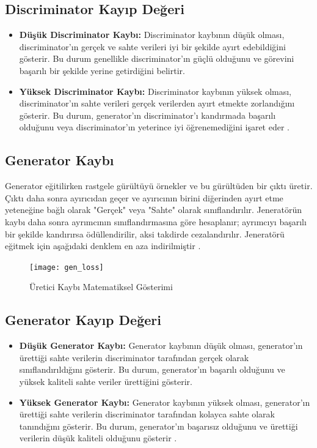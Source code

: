 \documentclass[10pt]{article}
\begin{document}
	\subsection{Discriminator Kayıp Değeri}
	\begin{itemize}
		\item \textbf{Düşük Discriminator Kaybı:} Discriminator kaybının düşük olması, discriminator'ın gerçek ve sahte verileri iyi bir şekilde ayırt edebildiğini gösterir. Bu durum genellikle discriminator'ın güçlü olduğunu ve görevini başarılı bir şekilde yerine getirdiğini belirtir.
		\item \textbf{Yüksek Discriminator Kaybı:} Discriminator kaybının yüksek olması, discriminator'ın sahte verileri gerçek verilerden ayırt etmekte zorlandığını gösterir. Bu durum, generator'ın discriminator'ı kandırmada başarılı olduğunu veya discriminator'ın yeterince iyi öğrenemediğini işaret eder \cite{loss_stackovervlof}.
	\end{itemize}
	
	\subsection{Generator Kaybı}
	Generator eğitilirken rastgele gürültüyü örnekler ve bu gürültüden bir çıktı üretir. Çıktı daha sonra ayırıcıdan geçer ve ayırıcının birini diğerinden ayırt etme yeteneğine bağlı olarak "Gerçek" veya "Sahte" olarak sınıflandırılır.
	Jeneratörün kaybı daha sonra ayrımcının sınıflandırmasına göre hesaplanır; ayrımcıyı başarılı bir şekilde kandırırsa ödüllendirilir, aksi takdirde cezalandırılır. Jeneratörü eğitmek için aşağıdaki denklem en aza indirilmiştir \cite{loss_neptune}.
	
	\begin{figure}[htbp]
		\centering
		\texttt{[image: gen\_loss]}
		\caption{Üretici Kaybı Matematiksel Gösterimi}
		\label{fig:gen_loss}
	\end{figure}
	
	\subsection{Generator Kayıp Değeri}
	\begin{itemize}
		\item \textbf{Düşük Generator Kaybı:} Generator kaybının düşük olması, generator'ın ürettiği sahte verilerin discriminator tarafından gerçek olarak sınıflandırıldığını gösterir. Bu durum, generator'ın başarılı olduğunu ve yüksek kaliteli sahte veriler ürettiğini gösterir.
		\item \textbf{Yüksek Generator Kaybı:} Generator kaybının yüksek olması, generator'ın ürettiği sahte verilerin discriminator tarafından kolayca sahte olarak tanındığını gösterir. Bu durum, generator'ın başarısız olduğunu ve ürettiği verilerin düşük kaliteli olduğunu gösterir \cite{loss_stackovervlof}.
	\end{itemize}
	
\end{document}
